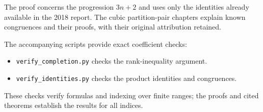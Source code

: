 \documentclass[12pt,a4paper]{report}
\theoremstyle{plain}
\theoremstyle{definition}
\theoremstyle{remark}
\begin{document}
The proof concerns the progression $3n+2$ and uses only the identities already available in the
2018 report. The cubic partition-pair chapters explain known congruences
and their proofs, with their original attribution retained.

The accompanying scripts provide exact coefficient checks:
\begin{itemize}
\item \texttt{verify\_completion.py} checks the rank-inequality argument.
\item \texttt{verify\_identities.py} checks the product identities and congruences.
\end{itemize}
These checks verify formulas and indexing over finite ranges; the proofs
and cited theorems establish the results for all indices.


\end{document}
